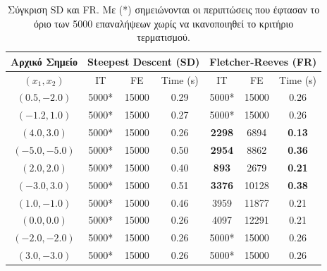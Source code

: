 \documentclass[a4paper,12pt]{article}
\begin{document}
\begin{table}[H]
\centering
\begin{tabular}{|c|c|c|c|c|c|c|}
\hline
\textbf{Αρχικό Σημείο} & \multicolumn{3}{c|}{\textbf{Steepest Descent (SD)}} & \multicolumn{3}{c|}{\textbf{Fletcher-Reeves (FR)}} \\ \hline
$(x_1, x_2)$ & IT & FE & Time (s) & IT & FE & Time (s) \\ \hline
$(0.5, -2.0)$ & 5000* & 15000 & 0.29 & 5000* & 15000 & 0.26 \\ \hline
$(-1.2, 1.0)$ & 5000* & 15000 & 0.27 & 5000* & 15000 & 0.26 \\ \hline
$(4.0, 3.0)$ & 5000* & 15000 & 0.26 & \textbf{2298} & 6894 & \textbf{0.13} \\ \hline
$(-5.0, -5.0)$ & 5000* & 15000 & 0.50 & \textbf{2954} & 8862 & \textbf{0.36} \\ \hline
$(2.0, 2.0)$ & 5000* & 15000 & 0.40 & \textbf{893} & 2679 & \textbf{0.21} \\ \hline
$(-3.0, 3.0)$ & 5000* & 15000 & 0.51 & \textbf{3376} & 10128 & \textbf{0.38} \\ \hline
$(1.0, -1.0)$ & 5000* & 15000 & 0.46 & 3959 & 11877 & 0.21 \\ \hline
$(0.0, 0.0)$ & 5000* & 15000 & 0.26 & 4097 & 12291 & 0.21 \\ \hline
$(-2.0, -2.0)$ & 5000* & 15000 & 0.26 & 5000* & 15000 & 0.26 \\ \hline
$(3.0, -3.0)$ & 5000* & 15000 & 0.26 & 5000* & 15000 & 0.26 \\ \hline
\end{tabular}
\caption{Σύγκριση SD και FR. Με (*) σημειώνονται οι περιπτώσεις που έφτασαν το όριο των 5000 επαναλήψεων χωρίς να ικανοποιηθεί το κριτήριο τερματισμού.}
\end{table}
\end{document}
